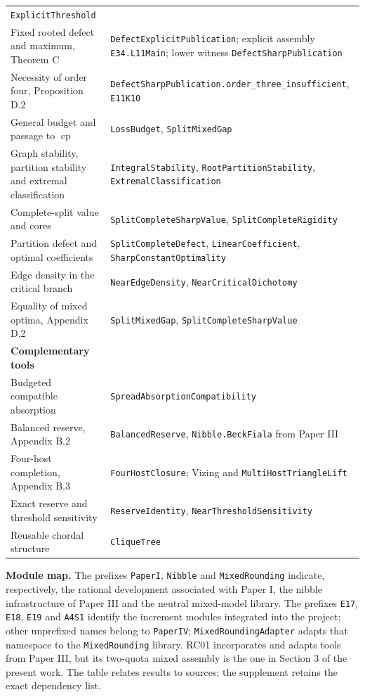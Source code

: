\documentclass[english,11pt,a4paper]{article}
\begin{document}
{\begin{longtable}[]{@{}
  >{\raggedright\arraybackslash}p{}
  >{\raggedright\arraybackslash}p{}@{}}
\nolinkurl{ExplicitThreshold} \\
Fixed rooted defect and maximum, Theorem C &
\nolinkurl{DefectExplicitPublication}; explicit assembly
\nolinkurl{E34.L11Main}; lower witness \nolinkurl{DefectSharpPublication} \\
Necessity of order four, Proposition D.2 &
\nolinkurl{DefectSharpPublication.order_three_insufficient},
\nolinkurl{E11K10} \\
General budget and passage to \(\operatorname{cp}\) &
\nolinkurl{LossBudget}, \nolinkurl{SplitMixedGap} \\
Graph stability, partition stability and extremal classification &
\nolinkurl{IntegralStability}, \nolinkurl{RootPartitionStability},
\nolinkurl{ExtremalClassification} \\
Complete-split value and cores & \nolinkurl{SplitCompleteSharpValue},
\nolinkurl{SplitCompleteRigidity} \\
Partition defect and optimal coefficients &
\nolinkurl{SplitCompleteDefect}, \nolinkurl{LinearCoefficient},
\nolinkurl{SharpConstantOptimality} \\
Edge density in the critical branch & \nolinkurl{NearEdgeDensity},
\nolinkurl{NearCriticalDichotomy} \\
Equality of mixed optima, Appendix D.2 & \nolinkurl{SplitMixedGap},
\nolinkurl{SplitCompleteSharpValue} \\
\textbf{Complementary tools} & \\
Budgeted compatible absorption &
\nolinkurl{SpreadAbsorptionCompatibility} \\
Balanced reserve, Appendix B.2 & \nolinkurl{BalancedReserve},
\nolinkurl{Nibble.BeckFiala} from Paper III \\
Four-host completion, Appendix B.3 & \nolinkurl{FourHostClosure}; Vizing
and \nolinkurl{MultiHostTriangleLift} \\
Exact reserve and threshold sensitivity & \nolinkurl{ReserveIdentity},
\nolinkurl{NearThresholdSensitivity} \\
Reusable chordal structure & \nolinkurl{CliqueTree} \\
\end{longtable}
}

\textbf{Module map.} The prefixes \nolinkurl{PaperI}, \nolinkurl{Nibble} and
\nolinkurl{MixedRounding} indicate, respectively, the rational development
associated with Paper I, the nibble infrastructure of Paper III and the
neutral mixed-model library. The prefixes \nolinkurl{E17}, \nolinkurl{E18},
\nolinkurl{E19} and \nolinkurl{A4S1} identify the increment modules integrated
into the project; other unprefixed names belong to \nolinkurl{PaperIV};
\nolinkurl{MixedRoundingAdapter} adapts that namespace to the
\nolinkurl{MixedRounding} library. RC01 incorporates and adapts tools from
Paper III, but its two-quota mixed assembly is the one in Section 3 of
the present work. The table relates results to sources; the supplement
retains the exact dependency list.
\end{document}
